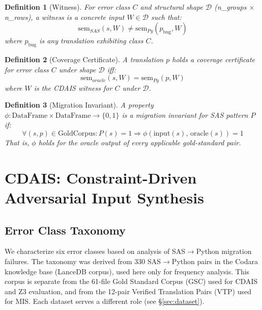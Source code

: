 \documentclass[conference]{IEEEtran}
\newtheorem{definition}{Definition}
\begin{document}
\begin{definition}[Witness]
For error class $C$ and structural shape $\mathcal{D}$ (n\_groups $\times$ n\_rows),
a \emph{witness} is a concrete input $W \in \mathcal{D}$ such that:
\[
  \text{sem}_{SAS}(s, W) \neq \text{sem}_{Py}(p_{\text{bug}}, W)
\]
where $p_{\text{bug}}$ is any translation exhibiting class $C$.
\end{definition}

\begin{definition}[Coverage Certificate]
A translation $p$ holds a \emph{coverage certificate} for error class $C$ under
shape $\mathcal{D}$ iff:
\[
  \text{sem}_{oracle}(s, W) = \text{sem}_{Py}(p, W)
\]
where $W$ is the CDAIS witness for $C$ under $\mathcal{D}$.
\end{definition}

\begin{definition}[Migration Invariant]
A property $\phi: \text{DataFrame} \times \text{DataFrame} \to \{0, 1\}$ is a
\emph{migration invariant} for SAS pattern $P$ if:
\[
  \forall (s, p) \in \text{GoldCorpus}: P(s) = 1 \Rightarrow
    \phi(\text{input}(s),\, \text{oracle}(s)) = 1
\]
That is, $\phi$ holds for the oracle output of every applicable gold-standard pair.
\end{definition}


\section{CDAIS: Constraint-Driven Adversarial Input Synthesis}
\label{sec:cdais}

\subsection{Error Class Taxonomy}
\label{sec:taxonomy}

We characterize six error classes based on analysis of SAS$\rightarrow$Python
migration failures. The taxonomy was derived from 330 SAS$\rightarrow$Python pairs in
the Codara knowledge base (LanceDB corpus), used here only for frequency analysis.
This corpus is separate from the 61-file Gold Standard Corpus (GSC) used for CDAIS
and Z3 evaluation, and from the 12-pair Verified Translation Pairs (VTP) used for
MIS. Each dataset serves a different role (see \S\ref{sec:dataset}).
\end{document}

